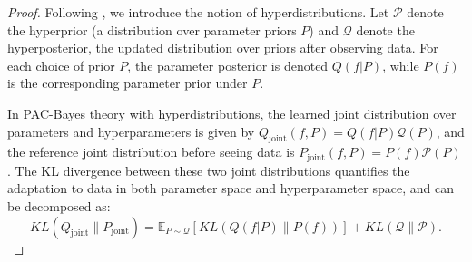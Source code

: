 \documentclass[letterpaper]{article} %
\begin{document}
\begin{proof}


Following \citep{pentinaPACBayesianBoundLifelong2014}, we introduce the notion of hyperdistributions. Let $\mathcal{P}$ denote the hyperprior (a distribution over parameter priors $P$) and $\mathcal{Q}$ denote the hyperposterior, the updated distribution over priors after observing data. For each choice of prior $P$, the parameter posterior is denoted $Q(f|P)$, while $P(f)$ is the corresponding parameter prior under $P$.

In PAC-Bayes theory with hyperdistributions, the learned joint distribution over parameters and hyperparameters is given by $Q_\text{joint}(f, P) = Q(f|P)\mathcal{Q}(P)$, and the reference joint distribution before seeing data is $P_\text{joint}(f, P) = P(f)\mathcal{P}(P)$. The KL divergence between these two joint distributions quantifies the adaptation to data in both parameter space and hyperparameter space, and can be decomposed as:
$$KL(Q_\text{joint} \| P_\text{joint}) = \mathbb{E}_{P \sim \mathcal{Q}} \left[ KL(Q(f|P) \| P(f)) \right] + KL(\mathcal{Q} \| \mathcal{P}).$$



\end{proof}
\end{document}
